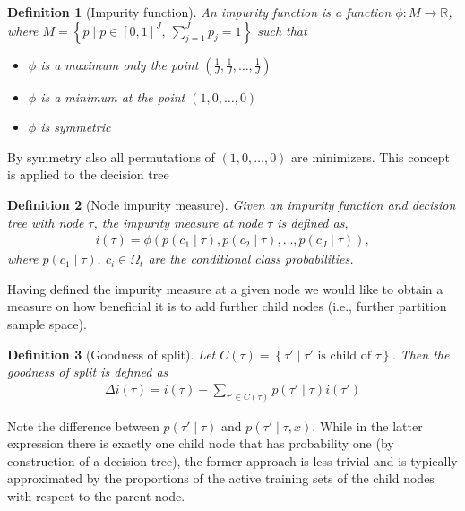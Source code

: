 \documentclass[12pt,a4paper]{article}
\newtheorem{definition}{Definition}
\begin{document}
\begin{definition}[Impurity function] An impurity function is a function $\phi: M \rightarrow \mathbb R$, where $M=\left\{p \mid p\in [0,1]^J, ~ \sum_{j=1}^J p_j=1\right\}$ such that
	\begin{itemize}\itemsep0em 
		\item $\phi$ is a maximum only the point $\left(\frac{1}{J}, \frac{1}{J}, \dots, \frac{1}{J}\right)$
		\item $\phi$ is a minimum at the point  $\left(1, 0, \dots, 0\right)$
		\item $\phi$ is symmetric
	\end{itemize}
\end{definition}
By symmetry also all permutations of $\left(1, 0, \dots, 0\right)$ are minimizers. This concept is applied to the decision tree
\begin{definition}[Node impurity measure] Given an impurity function and decision tree with node $\tau$, the impurity measure at node $\tau$ is defined as,
\begin{align*}
	i(\tau) = \phi(p(c_1\mid \tau), p(c_2\mid \tau), \dots, p(c_J\mid \tau)),
\end{align*}
where $p(c_1\mid \tau), ~ c_i \in \Omega_t$ are the conditional class probabilities.
\end{definition}
Having defined the impurity measure at a given node we would like to obtain a measure on how beneficial it is to add further child nodes (i.e., further partition sample space).
\begin{definition}[Goodness of split] \label{def:goodness_of_split}
	Let $C(\tau)=\left\{\tau' \mid \tau' \text{ is child of }\tau\right\}$. Then the goodness of split is defined as
	\begin{align*}
		\Delta i(\tau) = i(\tau) - \sum_{\tau' \in C(\tau)} p(\tau' \mid \tau) i(\tau')
	\end{align*} 
\end{definition}
Note the difference between $p(\tau' \mid \tau)$ and $p(\tau' \mid \tau, x)$. While in the latter expression there is exactly one child node that has probability one (by construction of a decision tree), the former approach is less trivial and is typically approximated by the proportions of the active training sets of the child nodes with respect to the parent node.
\end{document}
